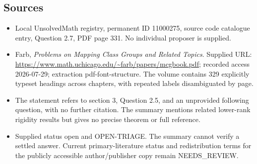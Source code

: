\documentclass[11pt]{article}
\begin{document}
\subsection{Sources}
\begin{itemize}
\item Local UnsolvedMath registry, permanent ID 11000275, source code catalogue entry, Question 2.7, PDF page 331. No individual proposer is supplied.
\item Farb, \emph{Problems on Mapping Class Groups and Related Topics}. Supplied URL: \url{https://www.math.uchicago.edu/~farb/papers/mcgbook.pdf}; recorded access 2026-07-29; extraction pdf-font-structure. The volume contains 329 explicitly typeset headings across chapters, with repeated labels disambiguated by page.
\item The statement refers to section 3, Question 2.5, and an unprovided following question, with no further citation. The summary mentions related lower-rank rigidity results but gives no precise theorem or full reference.
\item Supplied status open and OPEN-TRIAGE. The summary cannot verify a settled answer. Current primary-literature status and redistribution terms for the publicly accessible author/publisher copy remain NEEDS\_REVIEW.
\end{itemize}
\end{document}
